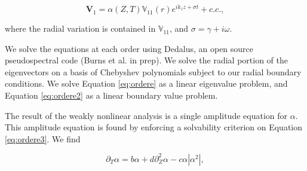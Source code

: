 \documentclass{emulateapj}
\newcommand{\beq}{\begin{equation}}
\newcommand{\eeq}{\end{equation}}
\newcommand\reym{\mathrm{Rm}}
\begin{document}
\beq
\label{eq:ansatz}
\mathbf{V}_1 = \alpha(Z, T) \mathbb{V}_{11}(r) e^{i k_z z + \sigma t} + c.c.,
\eeq

where the radial variation is contained in $\mathbb{V}_{11}$, and $\sigma = \gamma + i\omega$. 

We solve the equations at each order using Dedalus, an open source pseudospectral code (Burns et al. in prep). We solve the radial portion of the eigenvectors on a basis of Chebyshev polynomials subject to our radial boundary conditions. %
We solve Equation \ref{eq:ordere} as a linear eigenvalue problem, and Equation \ref{eq:ordere2} as a linear boundary value problem. %


The result of the weakly nonlinear analysis is a single amplitude equation for $\alpha$. This amplitude equation is found by enforcing a solvability criterion on Equation \ref{eq:ordere3}. We find

\beq
 \label{eq:gle}
\partial_T \alpha = b \alpha + d \partial_Z^2 \alpha - c \alpha \left|\alpha^2\right|,
\eeq
\end{document}
